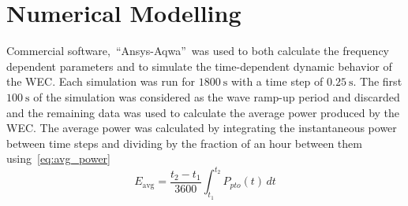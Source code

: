 \documentclass[10pt,journal,a4paper,twoside]{./IMEJ}
\begin{document}
\begin{table}[!t]
\centering
\caption{Design parameters and loading characteristics of the candidate WEC configurations.}
\label{tab:design_parameters}
\renewcommand{\arraystretch}{1.3}
\end{table}

\section{Numerical Modelling}
\label{sec:numerical_modelling}
Commercial software,~\enquote{Ansys-Aqwa\textregistered{}}~was used to both calculate the frequency dependent parameters and to simulate the time-dependent dynamic behavior of the WEC. Each simulation was run for $1800~\mathrm{s}$ with a time step of $0.25~\mathrm{s}$. The first $100~\mathrm{s}$ of the simulation was considered as the wave ramp-up period and discarded and the remaining data was used to calculate the average power produced by the WEC. The average power was calculated by integrating the instantaneous power between time steps and dividing by the fraction of an hour between them using~\eqref{eq:avg_power}
\begin{equation}
E_{\text{avg}} = \frac{t_2-t_1}{3600} \int_{t_1}^{t_2} P_{pto}(t) \, dt
\label{eq:avg_power}
\end{equation}
\end{document}
